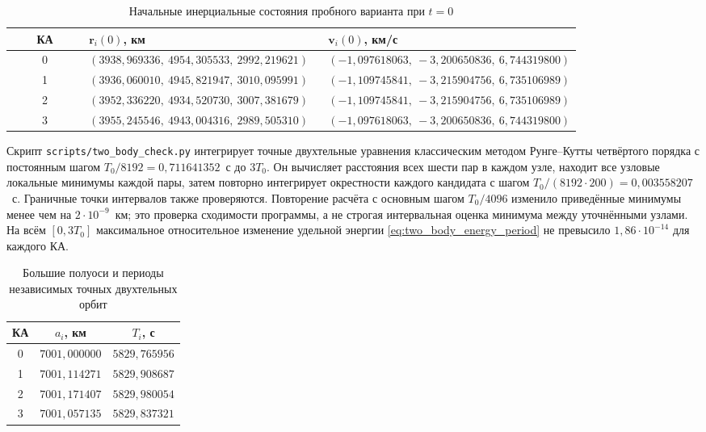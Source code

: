 \documentclass[a4paper,12pt]{article}
\begin{document}
\begin{table}[htbp]
\centering\scriptsize
\caption{Начальные инерциальные состояния пробного варианта при $t=0$}
\label{tab:initial_eci}
\begin{tabular}{c p{0.42\linewidth} p{0.40\linewidth}}
\toprule
КА & $\mathbf r_i(0)$, км & $\mathbf v_i(0)$, км/с\\
\midrule
0 & $(3938{,}969336,\ 4954{,}305533,\ 2992{,}219621)$ &
$(-1{,}097618063,\ -3{,}200650836,\ 6{,}744319800)$\\
1 & $(3936{,}060010,\ 4945{,}821947,\ 3010{,}095991)$ &
$(-1{,}109745841,\ -3{,}215904756,\ 6{,}735106989)$\\
2 & $(3952{,}336220,\ 4934{,}520730,\ 3007{,}381679)$ &
$(-1{,}109745841,\ -3{,}215904756,\ 6{,}735106989)$\\
3 & $(3955{,}245546,\ 4943{,}004316,\ 2989{,}505310)$ &
$(-1{,}097618063,\ -3{,}200650836,\ 6{,}744319800)$\\
\bottomrule
\end{tabular}
\end{table}

Скрипт \texttt{scripts/two\_body\_check.py} интегрирует
точные двухтельные уравнения классическим методом Рунге--Кутты
четвёртого порядка с постоянным шагом
$T_0/8192=0{,}711641352$~с до $3T_0$.
Он вычисляет расстояния всех шести пар в каждом узле,
находит все узловые локальные минимумы каждой пары,
затем повторно интегрирует окрестности каждого кандидата
с шагом $T_0/(8192\cdot200)=0{,}003558207$~с.
Граничные точки интервалов также проверяются.
Повторение расчёта с основным шагом $T_0/4096$
изменило приведённые минимумы менее чем на
$2\cdot10^{-9}$~км; это проверка сходимости программы,
а не строгая интервальная оценка минимума между
уточнёнными узлами. На всём $[0,3T_0]$
максимальное относительное изменение удельной
энергии \eqref{eq:two_body_energy_period} не превысило
$1{,}86\cdot10^{-14}$ для каждого КА.

\begin{table}[htbp]
\centering\small
\caption{Большие полуоси и периоды независимых точных двухтельных орбит}
\label{tab:two_body_periods}
\begin{tabular}{ccc}
\toprule
КА & $a_i$, км & $T_i$, с\\
\midrule
0 & $7001{,}000000$ & $5829{,}765956$\\
1 & $7001{,}114271$ & $5829{,}908687$\\
2 & $7001{,}171407$ & $5829{,}980054$\\
3 & $7001{,}057135$ & $5829{,}837321$\\
\bottomrule
\end{tabular}
\end{table}
\end{document}
